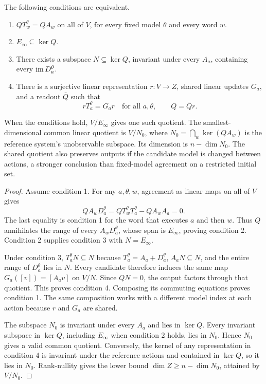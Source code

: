 \begin{GAtheorem}\label{GA:thm:commonquotient}
The following conditions are equivalent.
\begin{enumerate}
\item $QT_w^\theta=QA_w$ on all of $V$, for every fixed model $\theta$ and every word $w$.
\item $E_\infty\subseteq\ker Q$.
\item There exists a subspace $N\subseteq\ker Q$, invariant under every $A_a$, containing every $\operatorname{im} D_a^\theta$.
\item There is a surjective linear representation $r:V\to Z$, shared linear updates $G_a$, and a readout $\bar Q$ such that
\[
rT_a^\theta=G_ar\quad\text{for all }a,\theta,\qquad Q=\bar Qr.
\]
\end{enumerate}
When the conditions hold, $V/E_\infty$ gives one such quotient. The smallest-dimensional common linear quotient is $V/N_0$, where $N_0=\bigcap_w\ker(QA_w)$ is the reference system's unobservable subspace. Its dimension is $n-\dim N_0$. The shared quotient also preserves outputs if the candidate model is changed between actions, a stronger conclusion than fixed-model agreement on a restricted initial set.
\end{GAtheorem}
\begin{proof}
Assume condition 1. For any $a,\theta,w$, agreement as linear maps on all of $V$ gives
\[
QA_wD_a^\theta
=QT_w^\theta T_a^\theta-QA_wA_a=0.
\]
The last equality is condition 1 for the word that executes $a$ and then $w$. Thus $Q$ annihilates the range of every $A_wD_a^\theta$, whose span is $E_\infty$, proving condition 2. Condition 2 supplies condition 3 with $N=E_\infty$.

Under condition 3, $T_a^\theta N\subseteq N$ because $T_a^\theta=A_a+D_a^\theta$, $A_aN\subseteq N$, and the entire range of $D_a^\theta$ lies in $N$. Every candidate therefore induces the same map $G_a([v])=[A_av]$ on $V/N$. Since $QN=0$, the output factors through that quotient. This proves condition 4. Composing its commuting equations proves condition 1. The same composition works with a different model index at each action because $r$ and $G_a$ are shared.

The subspace $N_0$ is invariant under every $A_a$ and lies in $\ker Q$. Every invariant subspace in $\ker Q$, including $E_\infty$ when condition 2 holds, lies in $N_0$. Hence $N_0$ gives a valid common quotient. Conversely, the kernel of any representation in condition 4 is invariant under the reference actions and contained in $\ker Q$, so it lies in $N_0$. Rank-nullity gives the lower bound $\dim Z\ge n-\dim N_0$, attained by $V/N_0$.
\end{proof}

